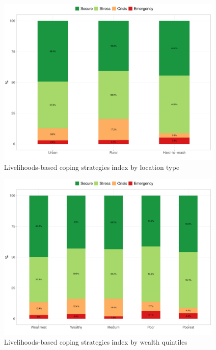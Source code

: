 \documentclass[12pt,a4paper]{article}
\begin{document}
\begin{figure}[H]

{\centering \includegraphics{kayahReport_files/figure-latex/lcsi1plot-1} 

}

\caption{Livelihoods-based coping strategies index by location type}\label{fig:lcsi1plot}
\end{figure}

\begin{figure}[H]

{\centering \includegraphics{kayahReport_files/figure-latex/lcsi2plot-1} 

}

\caption{Livelihoods-based coping strategies index by wealth quintiles}\label{fig:lcsi2plot}
\end{figure}
\end{document}
